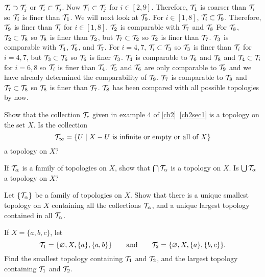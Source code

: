\begin{exercise}
  \(\mathcal{T}_i\supset\mathcal{T}_j\) or \(\mathcal{T}_i\subset\mathcal{T}_j\).
  Now \(\mathcal{T}_1\subset\mathcal{T}_j\) for \(i\in[2,9]\).
  Therefore, \(\mathcal{T}_1\) is coarser than \(\mathcal{T}_i\) so \(\mathcal{T}_i\) is finer than
  \(\mathcal{T}_1\).
  We will next look at \(\mathcal{T}_9\).
  For \(i\in[1,8]\), \(\mathcal{T}_i\subset\mathcal{T}_9\).
  Therefore, \(\mathcal{T}_9\) is finer than \(\mathcal{T}_i\) for \(i\in[1,8]\).
  \(\mathcal{T}_2\) is comparable with \(\mathcal{T}_7\) and \(\mathcal{T}_8\)
  For \(\mathcal{T}_8\), \(\mathcal{T}_2\subset\mathcal{T}_8\) so \(\mathcal{T}_8\) is finer than
  \(\mathcal{T}_2\), but \(\mathcal{T}_7\subset\mathcal{T}_2\) so \(\mathcal{T}_2\) is finer than
  \(\mathcal{T}_7\).
  \(\mathcal{T}_3\) is comparable with \(\mathcal{T}_4\), \(\mathcal{T}_6\), and \(\mathcal{T}_7\).
  For \(i = 4,7\), \(\mathcal{T}_i\subset\mathcal{T}_3\) so \(\mathcal{T}_3\) is finer than
  \(\mathcal{T}_i\) for \(i = 4,7\), but \(\mathcal{T}_3\subset\mathcal{T}_6\) so \(\mathcal{T}_6\) is
  finer \(\mathcal{T}_3\).
  \(\mathcal{T}_4\) is comparable to \(\mathcal{T}_6\) and \(\mathcal{T}_8\) and
  \(\mathcal{T}_4\subset\mathcal{T}_i\) for \(i = 6,8\) so \(\mathcal{T}_i\) is finer than
  \(\mathcal{T}_4\).
  \(\mathcal{T}_5\) and \(\mathcal{T}_6\) are only comparable to \(\mathcal{T}_9\) and we have
  already determined the comparability of \(\mathcal{T}_9\).
  \(\mathcal{T}_7\) is comparable to \(\mathcal{T}_8\) and \(\mathcal{T}_7\subset\mathcal{T}_8\) so
  \(\mathcal{T}_8\) is finer than \(\mathcal{T}_7\).
  \(\mathcal{T}_8\) has been compared with all possible topologies by now.
\item
  Show that the collection \(\mathcal{T}_c\) given in example \(4\) of
  \cref{ch2}~\cref{ch2sec1} is a topology on the set \(X\).
  Is the collection
  \[
  \mathcal{T}_{\infty} =
  \{U\mid X - U\text{ is infinite or empty or all of } X\}
  \]
  a topology on \(X\)?
\item
  \begin{exercise}[label = (\alph*)]
  \item
    If \(\mathcal{T}_{\alpha}\) is a family of topologies on \(X\), show that
    \(\bigcap\mathcal{T}_{\alpha}\) is a topology on \(X\).
    Is \(\bigcup\mathcal{T}_{\alpha}\) a topology on \(X\)?
  \item
    Let \(\{\mathcal{T}_{\alpha}\}\) be a family of topologies on \(X\).
    Show that there is a unique smallest topology on \(X\) containing all the
    collections \(\mathcal{T}_{\alpha}\), and a unique largest topology
    contained in all \(\mathcal{T}_{\alpha}\).
  \item
    If \(X = \{a,b,c\}\), let
    \[
    \mathcal{T}_1 = \{\varnothing, X, \{a\}, \{a, b\}\}\qquad\text{and}\qquad
    \mathcal{T}_2 = \{\varnothing, X, \{a\}, \{b, c\}\}.
    \]
    Find the smallest topology containing \(\mathcal{T}_1\) and \(\mathcal{T}_2\), and the
    largest topology containing \(\mathcal{T}_1\) and \(\mathcal{T}_2\).
  \end{exercise}
\item

\end{exercise}
